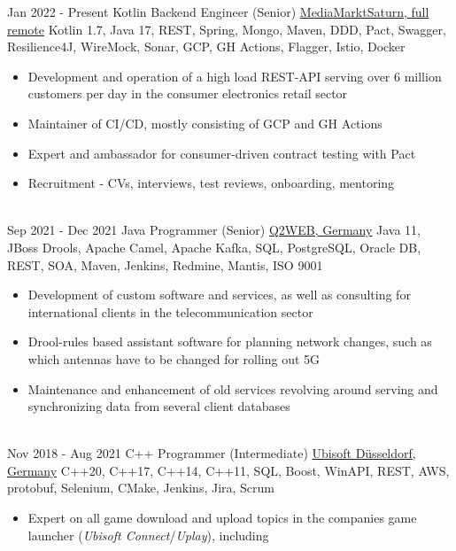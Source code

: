 \documentclass[letterpaper]{twentysecondcv} %
\begin{document}
\begin{twenty} %
	\twentyitem
    		{Jan 2022 -}
		{Present}
        		{Kotlin Backend Engineer (Senior)}
        		{\href{https://www.mediamarktsaturn.com/}{MediaMarktSaturn, full remote}}
        		{Kotlin 1.7, Java 17, REST, Spring, Mongo, Maven, DDD, Pact, Swagger, Resilience4J, WireMock, Sonar, GCP, GH Actions, Flagger, Istio, Docker}
        		{\begin{itemize}
        			\item Development and operation of a high load REST-API serving over 6 million customers per day in the consumer electronics retail sector
        			\item Maintainer of CI/CD, mostly consisting of GCP and GH Actions
        			\item Expert and ambassador for consumer-driven contract testing with Pact
        			\item Recruitment - CVs, interviews, test reviews, onboarding, mentoring
        		\end{itemize}}\\
     	\twentyitem
    		{Sep 2021 -}
		{Dec 2021}
        		{Java Programmer (Senior)}
        		{\href{https://www.q2web.de/}{Q2WEB, Germany}}
        		{Java 11, JBoss Drools, Apache Camel, Apache Kafka, SQL, PostgreSQL, Oracle DB, REST, SOA, Maven, Jenkins, Redmine, Mantis, ISO 9001}
        		{\begin{itemize}
        			\item Development of custom software and services, as well as consulting for international clients in the telecommunication sector
        			\item Drool-rules based assistant software for planning network changes, such as which antennas have to
        			be changed for rolling out 5G
        			\item Maintenance and enhancement of old services revolving around serving and synchronizing data from several client databases
        		\end{itemize}}\\
     	\twentyitem
    		{Nov 2018 -}
		{Aug 2021}
        		{C++ Programmer (Intermediate)}
        		{\href{https://duesseldorf.ubisoft.com/en}{Ubisoft Düsseldorf, Germany}}
        		{C++20, C++17, C++14, C++11, SQL, Boost, WinAPI, REST, AWS, protobuf, Selenium, CMake, Jenkins, Jira, Scrum}
        		{\begin{itemize}
        			\item Expert on all game download and upload topics in the companies game launcher (\textit{Ubisoft Connect}/\textit{Uplay}), including

\end{itemize}}
\end{twenty}
\end{document}
